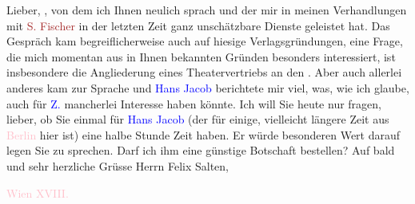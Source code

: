 \pstart{}Lieber,\pend
\pstart
           \label{K_L02948-1v}\label{K_L02948-1h}, von dem ich Ihnen neulich sprach und der mir in meinen Verhandlungen mit \textcolor{blue}{\textcolor{brown}{S. Fischer}{}\ledrightnote{\textcolor{brown}{S. Fischer Verlag}}}{}\ledrightnote{\textcolor{blue}{Samuel Fischer}} in der letzten Zeit ganz unschätzbare Dienste geleistet hat. Das Gespräch kam
               begreiflicherweise auch auf hiesige Verlagsgründungen, eine Frage, die mich momentan
               aus in Ihnen bekannten Gründen besonders interessiert, ist insbesondere die
               Angliederung eines Theatervertriebs an den \label{K_L02948-2v}\label{K_L02948-2h}. Aber
               auch allerlei anderes kam zur Sprache und \textcolor{blue}{Hans
                  Jacob}{}\ledrightnote{\textcolor{blue}{Hans Jacob}} berichtete mir viel, was, wie ich glaube, auch für \textcolor{blue}{Z.}{}\ledrightnote{\textcolor{blue}{Paul Zsolnay}} mancherlei Interesse haben könnte. Ich will Sie heute nur fragen, lieber, ob Sie einmal für \textcolor{blue}{Hans Jacob}{}\ledrightnote{\textcolor{blue}{Hans Jacob}} (der für einige, vielleicht längere
               Zeit aus \textcolor{pink}{Berlin}{}\ledrightnote{\textcolor{pink}{Berlin}} hier ist) eine halbe Stunde Zeit
               haben. Er würde besonderen Wert darauf legen Sie zu sprechen. Darf ich ihm eine
               günstige Botschaft bestellen?\pend
           \pstart Auf bald und sehr herzliche Grüsse\pend{}{\bigskip}
\pstart
           \noindent{}Herrn Felix Salten,\pend
           
\pstart
           \textcolor{pink}{Wien XVIII.}{}\ledrightnote{\textcolor{pink}{XVIII., Währing}}\pend
           \endnumbering{}  
      